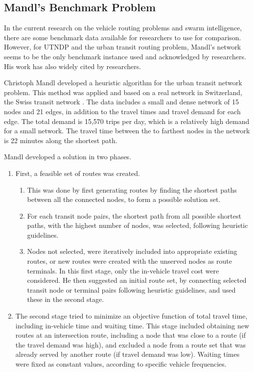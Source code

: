 \subsection{Mandl's Benchmark Problem}

In the current research on the vehicle routing problems and swarm intelligence, there are some benchmark data available for researchers to use for comparison. However, for UTNDP and the urban transit routing problem, Mandl's network seems to be the only benchmark instance used and acknowledged by researchers. His work has also widely cited by researchers. %

Christoph Mandl developed a heuristic algorithm for the urban transit network problem. This method was applied and based on a real network in Switzerland, the Swiss transit network \citep{mandl79} . The data includes a small and dense network of 15 nodes and 21 edges, in addition to the travel times and travel demand for each edge. The total demand is 15,570 trips per day, which is a relatively high demand for a small network. The travel time between the to farthest nodes in the network is 22 minutes along the shortest path. 

Mandl developed a solution in two phases. 

\begin{enumerate}
\item First, a feasible set of routes was created. 
\begin{enumerate}
\item This was done by first generating routes by finding the shortest paths between all the connected nodes, to form a possible solution set. %
\item For each transit node pairs, the shortest path from all possible shortest paths, with the highest number of nodes, was selected, following heuristic guidelines. 
\item Nodes not selected, were iteratively included into appropriate existing routes, or new routes were created with the unserved nodes as route terminals. 
In this first stage, only the in-vehicle travel cost were considered. He then suggested an initial route set, by connecting selected transit node or terminal pairs following heuristic guidelines, and used these in the second stage. 
\end{enumerate}
\item The second stage tried to minimize an objective function of total travel time, including in-vehicle time and waiting time. This stage included obtaining new routes at an intersection route, including a node that was close to a route (if the travel demand was high), and excluded a node from a route set that was already served by another route (if travel demand was low). Waiting times were fixed as constant values, according to specific vehicle frequencies.  
\end{enumerate}


